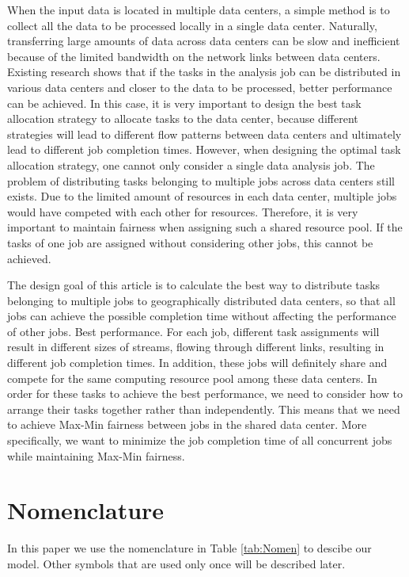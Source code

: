 \documentclass{llncs}
\begin{document}
When the input data is located in multiple data centers, a simple method is to collect all the data to be processed locally in a single data center. Naturally, transferring large amounts of data across data centers can be slow and inefficient because of the limited bandwidth on the network links between data centers. Existing research shows that if the tasks in the analysis job can be distributed in various data centers and closer to the data to be processed, better performance can be achieved. In this case, it is very important to design the best task allocation strategy to allocate tasks to the data center, because different strategies will lead to different flow patterns between data centers and ultimately lead to different job completion times. However, when designing the optimal task allocation strategy, one cannot only consider a single data analysis job. The problem of distributing tasks belonging to multiple jobs across data centers still exists. Due to the limited amount of resources in each data center, multiple jobs would have competed with each other for resources. Therefore, it is very important to maintain fairness when assigning such a shared resource pool. If the tasks of one job are assigned without considering other jobs, this cannot be achieved.

The design goal of this article is to calculate the best way to distribute tasks belonging to multiple jobs to geographically distributed data centers, so that all jobs can achieve the possible completion time without affecting the performance of other jobs. Best performance. For each job, different task assignments will result in different sizes of streams, flowing through different links, resulting in different job completion times. In addition, these jobs will definitely share and compete for the same computing resource pool among these data centers. In order for these tasks to achieve the best performance, we need to consider how to arrange their tasks together rather than independently. This means that we need to achieve Max-Min fairness between jobs in the shared data center. More specifically, we want to minimize the job completion time of all concurrent jobs while maintaining Max-Min fairness. 

\section{Nomenclature}
In this paper we use the nomenclature in Table \ref{tab:Nomen} to descibe our model. Other symbols that are used only once will be described later.
\end{document}
